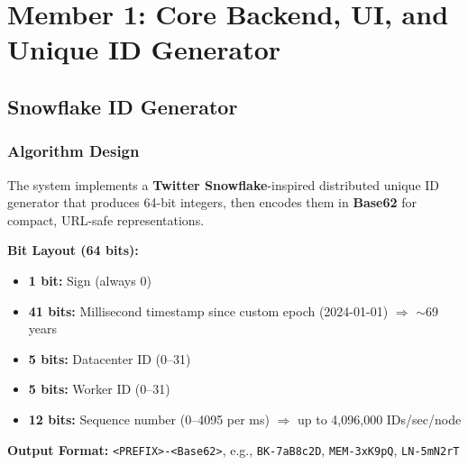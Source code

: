 \documentclass[12pt,a4paper]{report}
\begin{document}
\chapter{Member 1: Core Backend, UI, and Unique ID Generator}

\section{Snowflake ID Generator}

\subsection{Algorithm Design}
The system implements a \textbf{Twitter Snowflake}-inspired distributed unique ID generator that produces 64-bit integers, then encodes them in \textbf{Base62} for compact, URL-safe representations.

\textbf{Bit Layout (64 bits):}
\begin{itemize}[noitemsep]
    \item \textbf{1 bit:} Sign (always 0)
    \item \textbf{41 bits:} Millisecond timestamp since custom epoch (2024-01-01) $\Rightarrow$ $\sim$69 years
    \item \textbf{5 bits:} Datacenter ID (0--31)
    \item \textbf{5 bits:} Worker ID (0--31)
    \item \textbf{12 bits:} Sequence number (0--4095 per ms) $\Rightarrow$ up to 4,096,000 IDs/sec/node
\end{itemize}

\textbf{Output Format:} \texttt{<PREFIX>-<Base62>}, e.g., \texttt{BK-7aB8c2D}, \texttt{MEM-3xK9pQ}, \texttt{LN-5mN2rT}
\end{document}
